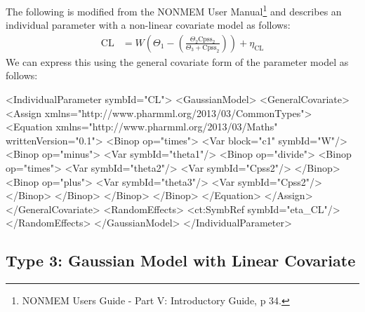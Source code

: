\documentclass[a4paper,11pt]{article}
\begin{document}
The following is modified from the NONMEM User Manual\footnote{NONMEM
  Users Guide - Part V: Introductory Guide, p 34.}  and describes an
individual parameter with a non-linear covariate model as follows:
%
\begin{align*}
\mathrm{CL} &= W \left(\Theta_1 -
  \left(\frac{\Theta_2 \mathrm{Cpss_2}}{\Theta_3 +
      \mathrm{Cpss}_2}\right)\right) + \eta_{\mathrm{CL}}
\end{align*}
%
We can express this using the general covariate form of the parameter model as follows: 
%
\begin{xmlcode}
<IndividualParameter symbId="CL">
    <GaussianModel>
        <GeneralCovariate>
            <Assign xmlns="http://www.pharmml.org/2013/03/CommonTypes">
                <Equation xmlns="http://www.pharmml.org/2013/03/Maths"
                    writtenVersion="0.1">
                    <Binop op="times">
                        <Var block="c1" symbId="W"/>
                        <Binop op="minus">
                            <Var symbId="theta1"/>
                            <Binop op="divide">
                                <Binop op="times">
                                    <Var symbId="theta2"/>
                                    <Var symbId="Cpss2"/>
                                </Binop>
                                <Binop op="plus">
                                    <Var symbId="theta3"/>
                                    <Var symbId="Cpss2"/>
                                </Binop>
                            </Binop>
                        </Binop>
                    </Binop>
                </Equation>
            </Assign>
        </GeneralCovariate>
        <RandomEffects>
            <ct:SymbRef symbId="eta_CL"/>
        </RandomEffects>
    </GaussianModel>
</IndividualParameter>
\end{xmlcode}


\subsection{Type 3: Gaussian Model with Linear Covariate}
\end{document}
